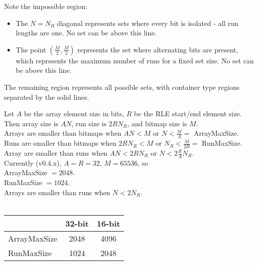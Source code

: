 \documentclass{article} %
\begin{document}
Note the impossible region:
\begin{itemize}
  \item The $N = N_R$ diagonal represents sets where every bit is isolated - all run lengths are one. No set can be above this line.
  \item The point $(\frac{M}{2}, \frac{M}{2})$ represents the set where alternating bits are
present, which represents the maximum number of runs for a fixed set size. No
set can be above this line.
\end{itemize}

The remaining region represents all possible sets,
with container type regions separated by the solid lines.

\bigskip

Let $A$ be the array element size in bits, $R$ be the RLE start/end element size. Then array size is $AN$, run size is
$2RN_R$, and bitmap size is $M$.\\

Arrays are smaller than bitmaps when $AN < M$ or $N < \frac{M}{A} = $ ArrayMaxSize.\\
Runs are smaller than bitmaps when $2RN_R < M$ or $N_R < \frac{M}{2R} = $ RunMaxSize.\\
Array are smaller than runs when $AN < 2RN_R$ or $N < 2\frac{R}{A} N_R$.\\

Currently (v0.4.x), $A = R = 32$, $M = 65536$, so\\ 

ArrayMaxSize $ = 2048$.\\
RunMaxSize $ = 1024$.\\
Arrays are smaller than runs when $N < 2 N_R$.\\
\\
\begin{tabular}{l | c | c}
    & 32-bit & 16-bit \\
  \hline
  ArrayMaxSize & 2048 & 4096 \\
  \hline
  RunMaxSize & 1024 & 2048 \\
\end{tabular}
\end{document}
